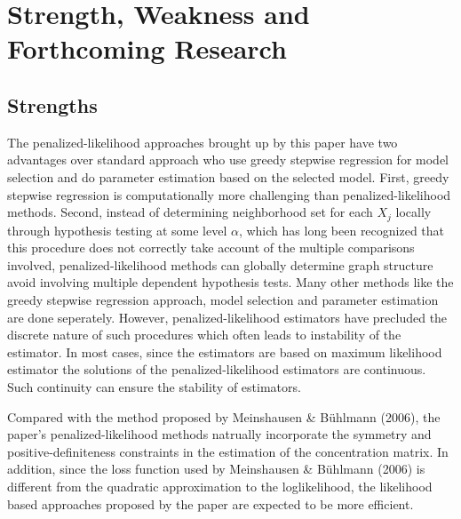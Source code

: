 
\section*{Strength, Weakness and Forthcoming Research}

\subsection*{Strengths}
The penalized-likelihood approaches brought up by this paper have two advantages over standard approach who use greedy stepwise regression for model selection and do parameter estimation based on the selected model.  First, greedy stepwise regression is computationally more challenging than penalized-likelihood methods.  Second, instead of determining neighborhood set for each $X_j$ locally through hypothesis testing at some level $\alpha$, which has long been recognized that this procedure does not correctly take account of the multiple comparisons involved, penalized-likelihood methods can globally determine graph structure avoid involving multiple dependent hypothesis tests.  Many other methods like the greedy stepwise regression approach, model selection and parameter estimation are done seperately.  However, penalized-likelihood estimators have precluded the discrete nature of such procedures which often leads to instability of the estimator.  In most cases, since the estimators are based on maximum likelihood estimator the solutions of the penalized-likelihood estimators are continuous.  Such continuity can ensure the stability of estimators.  

Compared with the method proposed by Meinshausen \& Bühlmann (2006), the paper's penalized-likelihood methods natrually incorporate the symmetry and positive-definiteness constraints in the estimation of the concentration matrix.  In addition, since the loss function used by Meinshausen \& Bühlmann (2006) is different from the quadratic approximation to the loglikelihood, the likelihood based approaches proposed by the paper are expected to be more efficient.
  



